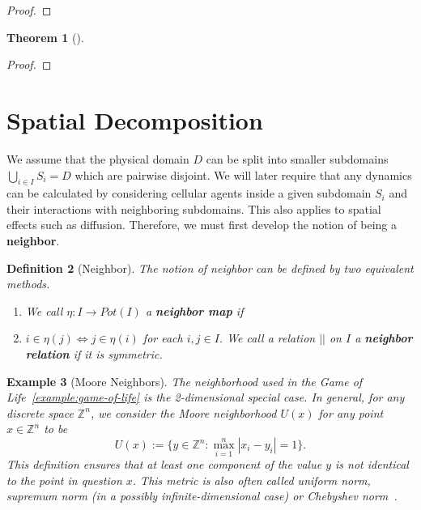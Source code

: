 \documentclass{article}
\newtheorem{definition}{Definition}[section]
\newtheorem{example}[definition]{Example}
\newtheorem{theorem}[definition]{Theorem}
\begin{document}
\begin{proof}
\end{proof}

\begin{theorem}[]
\end{theorem}
\begin{proof}
\end{proof}

\section{Spatial Decomposition}
\label{section:spatial-decomposition}
We assume that the physical domain $D$ can be split into smaller subdomains
$\bigcup_{i\in I}S_i=D$ which are pairwise disjoint.
We will later require that any dynamics can be calculated by considering cellular agents inside a
given subdomain $S_i$ and their interactions with neighboring subdomains.
This also applies to spatial effects such as diffusion.
Therefore, we must first develop the notion of being a \textbf{neighbor}.

\begin{definition}[Neighbor]
    The notion of neighbor can be defined by two equivalent methods.
    \begin{enumerate}
        \item We call $\eta:I\rightarrow Pot(I)$ a \textbf{neighbor map} if
        \item $i\in\eta(j) \Leftrightarrow j\in\eta(i)$ for each $i,j\in I$.
            We call a relation $||$ on $I$ a \textbf{neighbor relation} if it is symmetric.
    \end{enumerate}
\end{definition}

\begin{example}[Moore Neighbors]
    The neighborhood used in the Game of Life~\ref{example:game-of-life} is the 2-dimensional
    special case.
    In general, for any discrete space $\mathbb{Z}^n$, we consider the Moore neighborhood $U(x)$ for
    any point $x\in\mathbb{Z}^n$ to be
    \begin{equation}
        U(x) := \{y\in\mathbb{Z}^n:\max\limits_{i=1}^n|x_i-y_i|=1\}.
    \end{equation}
    This definition ensures that at least one component of the value $y$ is not identical to the
    point in question $x$.
    This metric is also often called uniform norm, supremum norm (in a possibly infinite-dimensional
    case) or Chebyshev norm~\cite{Rudin1976}.
\end{example}
\end{document}
